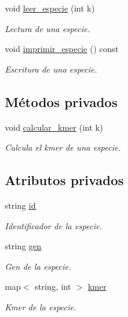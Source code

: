 \begin{DoxyCompactItemize}
void \hyperlink{class_especie_a59b02cb7174198fae20fe23230a527d4}{leer\+\_\+especie} (int k)
\begin{DoxyCompactList}\small\item\em Lectura de una especie. \end{DoxyCompactList}\item 
void \hyperlink{class_especie_a8a0613c113fbdd5ff21627ddd6f11f44}{imprimir\+\_\+especie} () const
\begin{DoxyCompactList}\small\item\em Escritura de una especie. \end{DoxyCompactList}\end{DoxyCompactItemize}
\subsection*{Métodos privados}
\begin{DoxyCompactItemize}
\item 
void \hyperlink{class_especie_a83fdef791142b0887bfa7f45bd0d5e0e}{calcular\+\_\+kmer} (int k)
\begin{DoxyCompactList}\small\item\em Calcula el kmer de una especie. \end{DoxyCompactList}\end{DoxyCompactItemize}
\subsection*{Atributos privados}
\begin{DoxyCompactItemize}
\item 
string \hyperlink{class_especie_a91b94109fb8a456bba7199cdda36d588}{id}
\begin{DoxyCompactList}\small\item\em Identificador de la especie. \end{DoxyCompactList}\item 
string \hyperlink{class_especie_ac35bb565f7346cd6317b3a8c849456d1}{gen}
\begin{DoxyCompactList}\small\item\em Gen de la especie. \end{DoxyCompactList}\item 
map$<$ string, int $>$ \hyperlink{class_especie_aa438e3e2f785d96c0ac51e83f60a5879}{kmer}
\begin{DoxyCompactList}\small\item\em Kmer de la especie. \end{DoxyCompactList}\end{DoxyCompactItemize}


